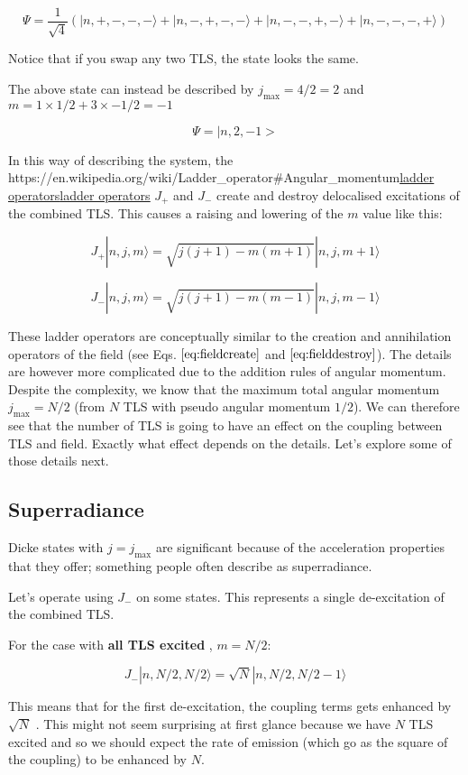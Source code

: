 \documentclass[
]{article}
\let\oldhref\href
\renewcommand{\href}[2]{\ifx#1\urlprefix\oldhref{#1}{#2}\else\uline{\oldhref{#1}{#2}}\fi}
\renewcommand{\[}{\begin{equation}}
\renewcommand{\]}{\end{equation}}
\begin{document}
\[
\Psi = \frac{1}{\sqrt{4}}\left(| n, +, -, -, - \rangle + | n, -, +, -, - \rangle + | n, -, -, +, - \rangle + | n, -, -, -, + \rangle \right)
\]

Notice that if you swap any two TLS, the state looks the same.

The above state can instead be described by \(j_{\max}= 4/2  = 2\) and
\(m = 1\times 1/2 + 3\times -1/2 =-1\)

\[
\Psi = |n,2,-1>
\]

In this way of describing the system, the
\href{https://en.wikipedia.org/wiki/Ladder_operator\#Angular_momentum}{ladder
operators} \(J_{+}\) and \(J_{-}\) create and destroy delocalised
excitations of the combined TLS. This causes a raising and lowering of
the \(m\) value like this:

\[
J_+ |n, j, m\rangle  =  \sqrt{j(j + 1) - m(m + 1)} |n, j, m + 1\rangle
\]

\[
J_- |n, j, m\rangle =  \sqrt{j(j + 1) - m(m - 1)} |n, j, m - 1\rangle
\]

These ladder operators are conceptually similar to the creation and
annihilation operators of the field (see Eqs. \(\ref{eq:fieldcreate}\)
and \(\ref{eq:fielddestroy}\)). The details are however more complicated
due to the addition rules of angular momentum. Despite the complexity,
we know that the maximum total angular momentum \(j_{\max} = N/2\) (from
\(N\) TLS with pseudo angular momentum \(1/2\)). We can therefore see
that the number of TLS is going to have an effect on the coupling
between TLS and field. Exactly what effect depends on the details. Let's
explore some of those details next.

\subsection{Superradiance}\label{superradiance}

Dicke states with \(j=j_{\max}\) are significant because of the
acceleration properties that they offer; something people often describe
as superradiance.

Let's operate using \(J_-\) on some states. This represents a single
de-excitation of the combined TLS.

For the case with \textbf{all TLS excited} , \(m=N/2\):

\[
J_- |n, N/2, N/2\rangle  = \sqrt{N} |n, N/2, N/2 - 1\rangle
\]

This means that for the first de-excitation, the coupling terms gets
enhanced by \(\sqrt{N}\) . This might not seem surprising at first
glance because we have \(N\) TLS excited and so we should expect the
rate of emission (which go as the square of the coupling) to be enhanced
by \(N\).
\end{document}
